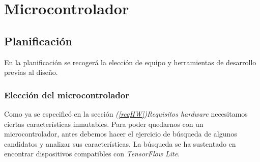 \chapter{Microcontrolador}
\section{Planificación}
En la planificación se recogerá la elección de equipo y herramientas de desarrollo
previas al diseño.
\subsection{Elección del microcontrolador}
Como ya se especificó en la sección \textit{(\ref{reqHW})Requisitos hardware}
necesitamos ciertas características inmutables. Para poder quedarnos con un
microcontrolador, antes debemos hacer el ejercicio de búsqueda de algunos
candidatos y analizar sus características. La búsqueda se ha sustentado
en encontrar dispositivos compatibles con \textit{TensorFlow Lite}.
